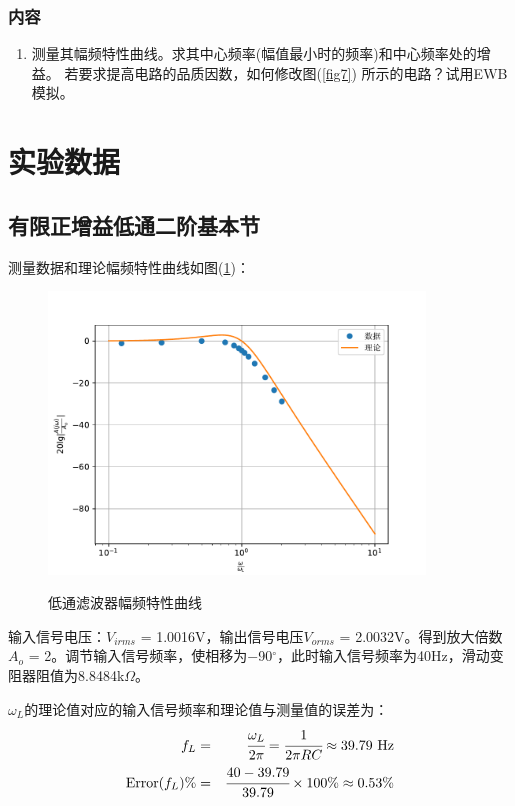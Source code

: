 \documentclass[a4paper]{article}
\begin{document}
\subsubsection{内容}
\begin{enumerate}
\item 测量其幅频特性曲线。求其中心频率(幅值最小时的频率)和中心频率处的增益。
若要求提高电路的品质因数，如何修改图(\ref{fig7}) 所示的电路？试用EWB模拟。
\end{enumerate}

\section{实验数据}
\subsection{有限正增益低通二阶基本节}
测量数据和理论幅频特性曲线如图(\ref{datafig1})：
\begin{figure}[!h]
\centering
\includegraphics[width=10cm]{fig/datafig1.pdf}\\
\caption{低通滤波器幅频特性曲线}\label{datafig1}
\end{figure}

输入信号电压：$V_{irms}$ = 1.0016V，输出信号电压$V_{orms}$ = 2.0032V。得到放大倍数$A_o$ = 2。调节输入信号频率，使相移为$-$90$^{\circ}$，此时输入信号频率为40Hz，滑动变阻器阻值为8.8484k$\Omega$。

$\omega_L$的理论值对应的输入信号频率和理论值与测量值的误差为：
\begin{eqnarray}
f_L &=& \cfrac{\omega_L}{2\pi} = \cfrac{1}{2\pi RC} \approx 39.79\text{ Hz}\label{f_L} \\
\text{Error($f_L$)\%} &=& \cfrac{40 - 39.79}{39.79}\times 100\% \approx 0.53\%
\end{eqnarray}
\end{document}
